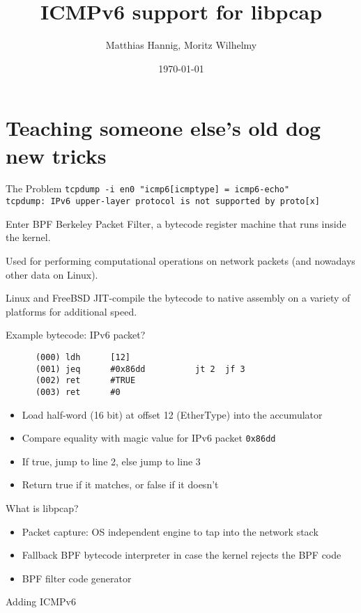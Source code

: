 \documentclass{beamer}
\title{ICMPv6 support for libpcap}
\date{\today}
\author{Matthias Hannig, Moritz Wilhelmy}
\institute{RIPE NCC IPv6 Hackathon Copenhagen}
\begin{document}
  \maketitle
  \section{Teaching someone else's old dog new tricks}
  \begin{frame}{The Problem}
    \texttt{tcpdump -i en0 "icmp6[icmptype] = icmp6-echo"}\\
    \texttt{tcpdump: IPv6 upper-layer protocol is not supported by proto[x]}
  \end{frame}

  \begin{frame}{Enter BPF}
    Berkeley Packet Filter, a bytecode register machine that runs inside the kernel.

    Used for performing computational operations on network packets (and nowadays other data on Linux).

    Linux and FreeBSD JIT-compile the bytecode to native assembly on a variety
    of platforms for additional speed.
  \end{frame}

  \begin{frame}[fragile]{Example bytecode: IPv6 packet?}
    \begin{verbatim}
      (000) ldh      [12]
      (001) jeq      #0x86dd          jt 2	jf 3
      (002) ret      #TRUE
      (003) ret      #0
    \end{verbatim}

    \begin{itemize}
      \item Load half-word (16 bit) at offset 12 (EtherType) into the accumulator
      \item Compare equality with magic value for IPv6 packet \texttt{0x86dd}
      \item If true, jump to line 2, else jump to line 3
      \item Return true if it matches, or false if it doesn't
    \end{itemize}
  \end{frame}

  \begin{frame}{What is libpcap?}
    \begin{itemize}
      \item Packet capture: OS independent engine to tap into the network stack
      \item Fallback BPF bytecode interpreter in case the kernel rejects the BPF code
      \item BPF filter code generator
    \end{itemize}
  \end{frame}

  \begin{frame}{Adding ICMPv6}

  \end{frame}

\end{document}
